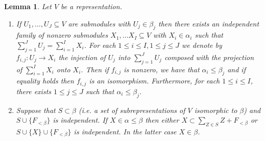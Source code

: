 \documentclass{article}
\newcommand{\parens}[1]{\left( #1 \right)}
\newtheorem{lemma}{Lemma}[section]
\newcommand{\hilight}[1]{\colorbox{yellow}{#1}}
\begin{document}
\begin{lemma} \label{lm:summing beta reps}
  Let $V$ be a representation. 
  \begin{enumerate}
  \item If $U_1, \ldots, U_J \subseteq V$ are submodules with $U_j \in \beta_j$ then there exists an independent family of nonzero submodules $X_1 , \ldots X_I \subseteq V$ with $X_i \in \alpha_i$ such that $\sum_{j = 1}^J U_j = \sum_{i = 1}^I X_i$. For each $1 \leq i \leq I, 1 \leq j \leq J$ we denote by $f_{i,j} : U_j \to X_i$ the injection of $U_j$ into $\sum_{j = 1}^J U_j$ composed with the projection of $\sum_{i = 1}^I X_i$ onto $X_i$. Then if $f_{i , j}$ is nonzero, we have that $\alpha_i \leq \beta_j$ and if equality holds then $f_{i , j}$ is an isomorphism. Furthermore, for each $1 \leq i \leq I$, there exists $1 \leq j \leq J$ such that $\alpha_i \leq \beta_j$. 

    \item Suppose that $S \subset \beta$ (i.e. a set of subrepresentations of $V$ isomorphic to $\beta$) and $S \cup \{F_{<\beta}\}$ is independent.  If $X \in \alpha \leq \beta$ then either $X \subset \sum_{Z \in S} Z + F_{<\beta}$ or $S \cup \{X\} \cup \{F_{<\beta}\}$ is independent. In the latter case $X \in \beta$.


  \end{enumerate}
\end{lemma}
\end{document}
